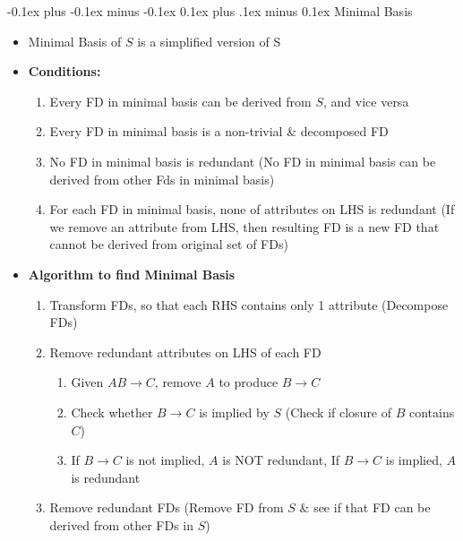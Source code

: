 \documentclass[landscape]{article}
\makeatletter
\renewcommand{\subsection}{\@startsection{subsection}{2}{0mm}%
  {-0.1ex plus -0.1ex minus -0.1ex}%
  {0.1ex plus .1ex minus 0.1ex}%
{\normalfont\scriptsize\bfseries}}
\makeatother
\begin{document}
\begin{multicols*}{5}
    \subsection{Minimal Basis}
    \begin{itemize}
      \item Minimal Basis of $S$ is a simplified version of S
      \item \textbf{Conditions:}
      \begin{enumerate}
        \item Every FD in minimal basis can be derived from $S$, and vice versa
        \item Every FD in minimal basis is a non-trivial \& decomposed FD
        \item No FD in minimal basis is redundant (No FD in minimal basis can be derived from other Fds in minimal basis)
        \item For each FD in minimal basis, none of attributes on LHS is redundant (If we remove an attribute from LHS, then resulting FD is a new FD that cannot be derived from original set of FDs)
      \end{enumerate}
      \item \textbf{Algorithm to find Minimal Basis}
      \begin{enumerate}
        \item Transform FDs, so that each RHS contains only 1 attribute (Decompose FDs)
        \item Remove redundant attributes on LHS of each FD
        \begin{enumerate}[label=\alph*]
          \item Given $AB \rightarrow C$, remove $A$ to produce $B \rightarrow C$
          \item Check whether $B \rightarrow C$ is implied by $S$ (Check if closure of $B$ contains $C$)
          \item If $B \rightarrow C$ is not implied, $A$ is NOT redundant, If $B \rightarrow C$ is implied, $A$ is redundant
        \end{enumerate}
        \item Remove redundant FDs (Remove FD from $S$ \& see if that FD can be derived from other FDs in $S$)
      \end{enumerate}
    \end{itemize}
  \end{multicols*}
\end{document}
